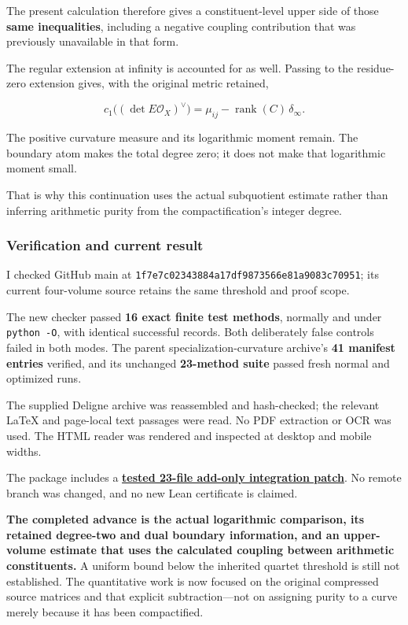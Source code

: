 The present calculation therefore gives a constituent-level upper side of those \textbf{same inequalities}, including a negative coupling contribution that was previously unavailable in that form.

The regular extension at infinity is accounted for as well. Passing to the residue-zero extension gives, with the original metric retained,

\[
c_1\bigl((\det E\mathcal O_X)^\vee\bigr)
=
\mu_{ij}-\operatorname{rank}(C)\,\delta_\infty.
\]

The positive curvature measure and its logarithmic moment remain. The boundary atom makes the total degree zero; it does not make that logarithmic moment small.

That is why this continuation uses the actual subquotient estimate rather than inferring arithmetic purity from the compactification's integer degree.

\subsubsection{Verification and current result}\label{endpoint-exponential_constituent_original--verification-and-current-result}

I checked GitHub main at \nolinkurl{1f7e7c02343884a17df9873566e81a9083c70951}; its current four-volume source retains the same threshold and proof scope.

The new checker passed \textbf{16 exact finite test methods}, normally and under \texttt{python\ -O}, with identical successful records. Both deliberately false controls failed in both modes. The parent specialization-curvature archive's \textbf{41 manifest entries} verified, and its unchanged \textbf{23-method suite} passed fresh normal and optimized runs.

The supplied Deligne archive was reassembled and hash-checked; the relevant LaTeX and page-local text passages were read. No PDF extraction or OCR was used. The HTML reader was rendered and inspected at desktop and mobile widths.

The package includes a \href{sources/endpoint_user_sources/HISTORICAL_DOWNLOAD_LINKS.md}{\textbf{tested 23-file add-only integration patch}}. No remote branch was changed, and no new Lean certificate is claimed.

\textbf{The completed advance is the actual logarithmic comparison, its retained degree-two and dual boundary information, and an upper-volume estimate that uses the calculated coupling between arithmetic constituents.} A uniform bound below the inherited quartet threshold is still not established. The quantitative work is now focused on the original compressed source matrices and that explicit subtraction---not on assigning purity to a curve merely because it has been compactified.
